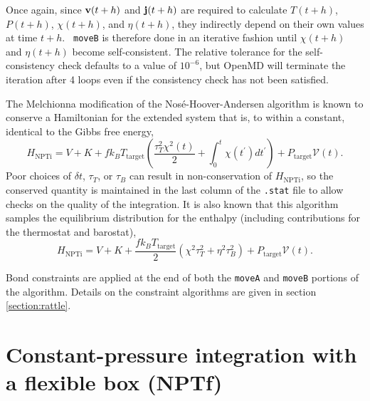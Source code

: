 \documentclass[letterpaper]{report}
\begin{document}
Once again, since ${\bf v}(t + h)$ and ${\bf j}(t + h)$ are required
to calculate $T(t + h)$, $P(t + h)$, $\chi(t + h)$, and $\eta(t +
h)$, they indirectly depend on their own values at time $t + h$.  {\tt
moveB} is therefore done in an iterative fashion until $\chi(t + h)$
and $\eta(t + h)$ become self-consistent.  The relative tolerance for
the self-consistency check defaults to a value of $\mbox{10}^{-6}$,
but OpenMD will terminate the iteration after 4 loops even if the
consistency check has not been satisfied.

The Melchionna modification of the Nos\'e-Hoover-Andersen algorithm is
known to conserve a Hamiltonian for the extended system that is, to
within a constant, identical to the Gibbs free energy,
\begin{equation}
H_{\mathrm{NPTi}} = V + K + f k_B T_{\mathrm{target}} \left(
\frac{\tau_{T}^2 \chi^2(t)}{2} + \int_{0}^{t} \chi(t^\prime) dt^\prime
\right) + P_{\mathrm{target}} \mathcal{V}(t).
\end{equation}
Poor choices of $\delta t$, $\tau_T$, or $\tau_B$ can result in
non-conservation of $H_{\mathrm{NPTi}}$, so the conserved quantity is
maintained in the last column of the {\tt .stat} file to allow checks
on the quality of the integration.  It is also known that this
algorithm samples the equilibrium distribution for the enthalpy
(including contributions for the thermostat and barostat), 
\begin{equation}
H_{\mathrm{NPTi}} = V + K + \frac{f k_B T_{\mathrm{target}}}{2} \left(
\chi^2 \tau_T^2 + \eta^2 \tau_B^2 \right) +  P_{\mathrm{target}}
\mathcal{V}(t). 
\end{equation}

Bond constraints are applied at the end of both the {\tt moveA} and
{\tt moveB} portions of the algorithm.  Details on the constraint
algorithms are given in section \ref{section:rattle}.

\section{\label{sec:NPTf}Constant-pressure integration with a
flexible box (NPTf)} 
\end{document}

